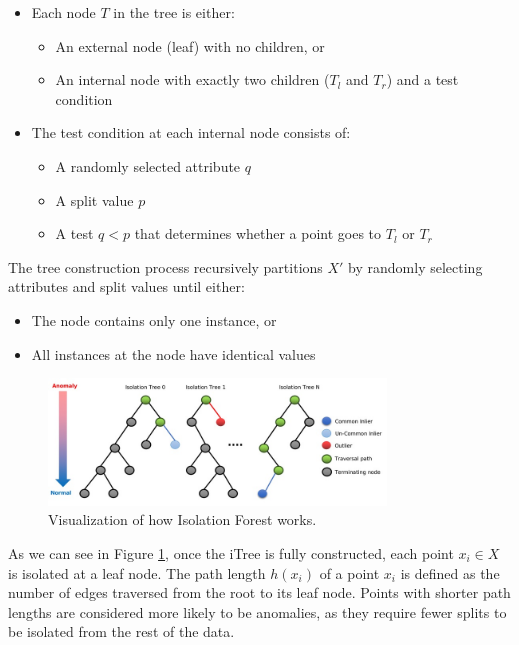 \documentclass[11pt,english,a4paper,hidelinks]{book}
\begin{document}
\begin{itemize}
    \item Each node $T$ in the tree is either:
    \begin{itemize}
        \item An external node (leaf) with no children, or
        \item An internal node with exactly two children ($T_l$ and $T_r$) and a test condition
    \end{itemize}
    \item The test condition at each internal node consists of:
    \begin{itemize}
        \item A randomly selected attribute $q$
        \item A split value $p$
        \item A test $q < p$ that determines whether a point goes to $T_l$ or $T_r$
    \end{itemize}
\end{itemize}

\noindent The tree construction process recursively partitions $X'$ by randomly selecting attributes and split values until either:
\begin{itemize}
    \item The node contains only one instance, or
    \item All instances at the node have identical values
\end{itemize}
\begin{figure}[H]
    \centering
    \includegraphics[width=0.8\textwidth]{images/code/outliers/IF.jpeg}
    \caption{Visualization of how Isolation Forest works.}
    \label{fig:isolation_forest}
\end{figure}

\noindent As we can see in Figure \ref{fig:isolation_forest}, once the iTree is fully constructed, each point $x_i \in X$ is isolated at a leaf node. The path length $h(x_i)$ of a point $x_i$ is defined as the number of edges traversed from the root to its leaf node. Points with shorter path lengths are considered more likely to be anomalies, as they require fewer splits to be isolated from the rest of the data.
\end{document}
